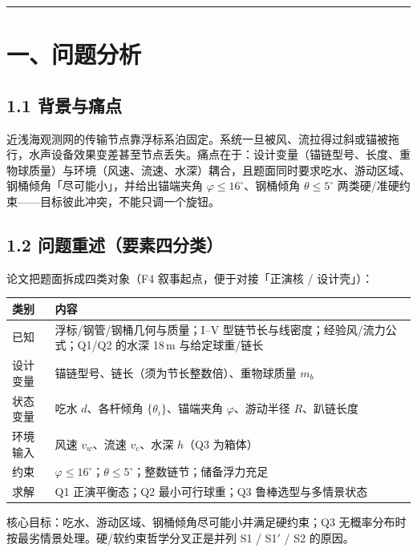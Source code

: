 \documentclass[UTF8,a4paper,zihao=-4]{ctexart}
\begin{document}
\vspace{0.4em}\hrule\vspace{0.4em}

\section{\texorpdfstring{一、问题分析}{一、问题分析}}

\subsection{\texorpdfstring{1.1 背景与痛点}{1.1 背景与痛点}}

近浅海观测网的传输节点靠浮标系泊固定。系统一旦被风、流拉得过斜或锚被拖行，水声设备效果变差甚至节点丢失。痛点在于：设计变量（锚链型号、长度、重物球质量）与环境（风速、流速、水深）耦合，且题面同时要求吃水、游动区域、钢桶倾角「尽可能小」，并给出锚端夹角 \(\varphi\le16^\circ\)、钢桶倾角 \(\theta\le5^\circ\) 两类硬/准硬约束------目标彼此冲突，不能只调一个旋钮。

\subsection{\texorpdfstring{1.2 问题重述（要素四分类）}{1.2 问题重述（要素四分类）}}

论文把题面拆成四类对象（F4 叙事起点，便于对接「正演核 / 设计壳」）：

\begin{center}\footnotesize
\begin{tabularx}{\textwidth}{|>{\raggedright\arraybackslash}p{2.2cm}|>{\raggedright\arraybackslash}X|}
\hline
\textbf{类别} & \textbf{内容} \\
\hline
已知 & 浮标/钢管/钢桶几何与质量；I--V 型链节长与线密度；经验风/流力公式；Q1/Q2 的水深 18\,m 与给定球重/链长 \\
\hline
设计变量 & 锚链型号、链长（须为节长整数倍）、重物球质量 \(m_b\) \\
\hline
状态变量 & 吃水 \(d\)、各杆倾角 \(\{\theta_i\}\)、锚端夹角 \(\varphi\)、游动半径 \(R\)、趴链长度 \\
\hline
环境输入 & 风速 \(v_w\)、流速 \(v_c\)、水深 \(h\)（Q3 为箱体） \\
\hline
约束 & \(\varphi\le16^\circ\)；\(\theta\le5^\circ\)；整数链节；储备浮力充足 \\
\hline
求解 & Q1 正演平衡态；Q2 最小可行球重；Q3 鲁棒选型与多情景状态 \\
\hline
\end{tabularx}
\end{center}
\vspace{0.25em}
核心目标：吃水、游动区域、钢桶倾角尽可能小并满足硬约束；Q3 无概率分布时按最劣情景处理。硬/软约束哲学分叉正是并列 S1 / S1$'$ / S2 的原因。
\end{document}
